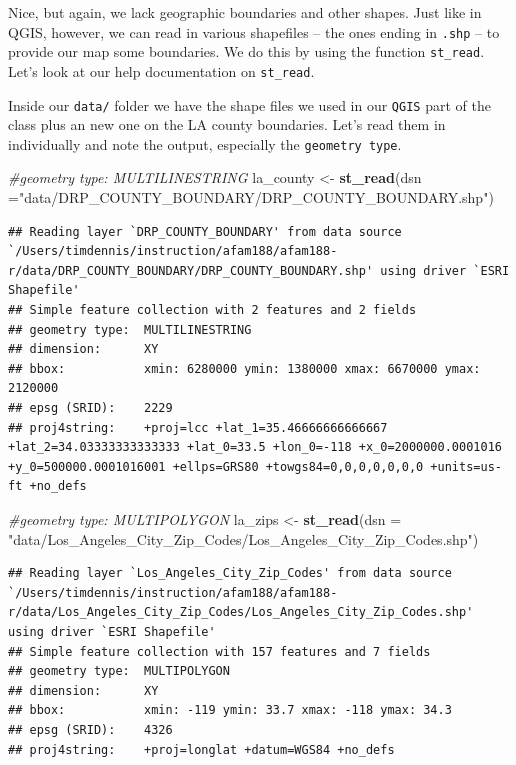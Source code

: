 \documentclass[]{book}
\newenvironment{Shaded}{\begin{snugshade}}{\end{snugshade}}
\newcommand{\CommentTok}[1]{\textcolor[rgb]{0.56,0.35,0.01}{\textit{#1}}}
\newcommand{\DataTypeTok}[1]{\textcolor[rgb]{0.13,0.29,0.53}{#1}}
\newcommand{\KeywordTok}[1]{\textcolor[rgb]{0.13,0.29,0.53}{\textbf{#1}}}
\newcommand{\NormalTok}[1]{#1}
\newcommand{\StringTok}[1]{\textcolor[rgb]{0.31,0.60,0.02}{#1}}
\begin{document}
Nice, but again, we lack geographic boundaries and other shapes. Just like in QGIS, however, we can read in various shapefiles -- the ones ending in \texttt{.shp} -- to provide our map some boundaries. We do this by using the function \texttt{st\_read}. Let's look at our help documentation on \texttt{st\_read}.

Inside our \texttt{data/} folder we have the shape files we used in our \texttt{QGIS} part of the class plus an new one on the LA county boundaries. Let's read them in individually and note the output, especially the \texttt{geometry\ type}.

\begin{Shaded}
\begin{Highlighting}[]
\CommentTok{#geometry type:  MULTILINESTRING}
\NormalTok{la_county <-}\StringTok{ }\KeywordTok{st_read}\NormalTok{(}\DataTypeTok{dsn =}\StringTok{"data/DRP_COUNTY_BOUNDARY/DRP_COUNTY_BOUNDARY.shp"}\NormalTok{)}
\end{Highlighting}
\end{Shaded}

\begin{verbatim}
## Reading layer `DRP_COUNTY_BOUNDARY' from data source `/Users/timdennis/instruction/afam188/afam188-r/data/DRP_COUNTY_BOUNDARY/DRP_COUNTY_BOUNDARY.shp' using driver `ESRI Shapefile'
## Simple feature collection with 2 features and 2 fields
## geometry type:  MULTILINESTRING
## dimension:      XY
## bbox:           xmin: 6280000 ymin: 1380000 xmax: 6670000 ymax: 2120000
## epsg (SRID):    2229
## proj4string:    +proj=lcc +lat_1=35.46666666666667 +lat_2=34.03333333333333 +lat_0=33.5 +lon_0=-118 +x_0=2000000.0001016 +y_0=500000.0001016001 +ellps=GRS80 +towgs84=0,0,0,0,0,0,0 +units=us-ft +no_defs
\end{verbatim}

\begin{Shaded}
\begin{Highlighting}[]
\CommentTok{#geometry type:  MULTIPOLYGON}
\NormalTok{la_zips <-}\StringTok{ }\KeywordTok{st_read}\NormalTok{(}\DataTypeTok{dsn =} \StringTok{"data/Los_Angeles_City_Zip_Codes/Los_Angeles_City_Zip_Codes.shp"}\NormalTok{)}
\end{Highlighting}
\end{Shaded}

\begin{verbatim}
## Reading layer `Los_Angeles_City_Zip_Codes' from data source `/Users/timdennis/instruction/afam188/afam188-r/data/Los_Angeles_City_Zip_Codes/Los_Angeles_City_Zip_Codes.shp' using driver `ESRI Shapefile'
## Simple feature collection with 157 features and 7 fields
## geometry type:  MULTIPOLYGON
## dimension:      XY
## bbox:           xmin: -119 ymin: 33.7 xmax: -118 ymax: 34.3
## epsg (SRID):    4326
## proj4string:    +proj=longlat +datum=WGS84 +no_defs
\end{verbatim}
\end{document}
